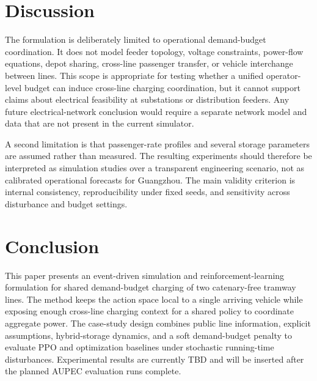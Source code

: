 \documentclass[conference]{IEEEtran}
\begin{document}
\section{Discussion}
The formulation is deliberately limited to operational demand-budget coordination. It does not model feeder topology, voltage constraints, power-flow equations, depot sharing, cross-line passenger transfer, or vehicle interchange between lines. This scope is appropriate for testing whether a unified operator-level budget can induce cross-line charging coordination, but it cannot support claims about electrical feasibility at substations or distribution feeders. Any future electrical-network conclusion would require a separate network model and data that are not present in the current simulator.

A second limitation is that passenger-rate profiles and several storage parameters are assumed rather than measured. The resulting experiments should therefore be interpreted as simulation studies over a transparent engineering scenario, not as calibrated operational forecasts for Guangzhou. The main validity criterion is internal consistency, reproducibility under fixed seeds, and sensitivity across disturbance and budget settings.

\section{Conclusion}
This paper presents an event-driven simulation and reinforcement-learning formulation for shared demand-budget charging of two catenary-free tramway lines. The method keeps the action space local to a single arriving vehicle while exposing enough cross-line charging context for a shared policy to coordinate aggregate power. The case-study design combines public line information, explicit assumptions, hybrid-storage dynamics, and a soft demand-budget penalty to evaluate PPO and optimization baselines under stochastic running-time disturbances. Experimental results are currently TBD and will be inserted after the planned AUPEC evaluation runs complete.



\end{document}
